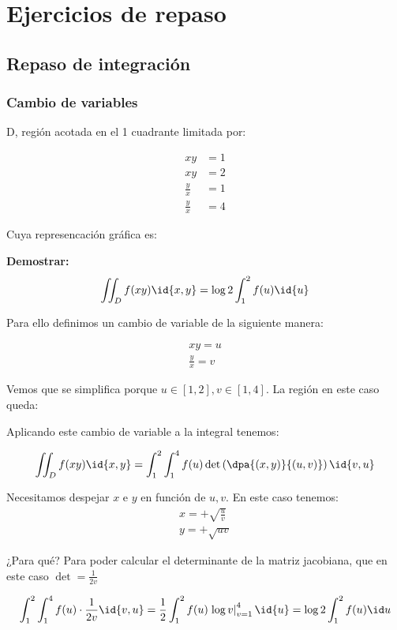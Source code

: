 \section{Ejercicios de repaso}
\subsection{Repaso de integración}
\subsubsection{Cambio de variables}

D, región acotada en el 1 cuadrante limitada por:

\[\begin{array}{cc}
xy&=1\\xy&=2\\\frac{y}{x} &=1\\\frac{y}{x}&=4
\end{array}\]

Cuya represencación gráfica es:


\textbf{Demostrar:}\[\iint_D f(xy)\id{x,y} = \log 2 \int_1^2f(u)\id{u}\]

Para ello definimos un cambio de variable de la siguiente manera:

\begin{gather*}
xy=u\\
\frac{y}{x}=v
\end{gather*}

Vemos que se simplifica porque $u\in[1,2],v\in[1,4]$. La región en este caso queda:


Aplicando este cambio de variable a la integral tenemos:

\[\iint_D f(xy)\id{x,y} = \int_1^2\int_1^4 f(u) \det \left(\dpa{(x,y)}{(u,v)}\right)\id{v,u}\]

Necesitamos despejar $x$ e $y$ en función de $u,v$. En este caso tenemos: 
\begin{gather*}
x=+\sqrt{\frac{u}{v}}\\ y= + \sqrt{uv}
\end{gather*}

¿Para qué? Para poder calcular el determinante de la matriz jacobiana, que en este caso $\displaystyle\det = \frac{1}{2v}$

\[\int_1^2\int_1^4 f(u)\cdot  \frac{1}{2v}\id{v,u} = \frac{1}{2} \int_1^2 f(u) \left.\log v\right|_{v=1}^4 \id{u} = \log 2 \int_1^2 f(u) \id u \]

